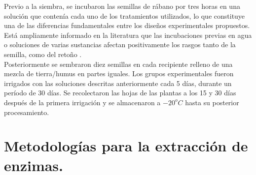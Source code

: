 Previo a la siembra, se incubaron las semillas de r\'abano por tres horas en una soluci\'on que conten\'ia cada uno de los tratamientos utilizados, lo que constituye una de las diferencias fundamentales entre los dise\~nos experimentales propuestos. Est\'a ampliamente informado en la literatura que las incubaciones previas en agua o soluciones de varias sustancias afectan positivamente los rasgos tanto de la semilla, como del reto\~no \citep{burgass1984evidence, bradford1986manipulation, taylor1998seed, mcdonald2000seed}.\\

Posteriormente se sembraron diez semillas en cada recipiente relleno de una mezcla de tierra/humus en partes iguales. Los grupos experimentales fueron irrigados con las soluciones descritas anteriormente cada 5 días, durante un período de 30 días. Se recolectaron las hojas de las plantas a los 15 y 30 días después de la primera irrigación y se almacenaron a $-20^oC$ hasta su posterior procesamiento.

%

\section{Metodolog\'ias para la extracci\'on de enzimas.}

